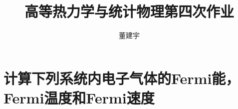 \documentclass[reqno,a4paper,12pt]{amsart}
\title{高等热力学与统计物理第四次作业}
\author{董建宇}
\begin{document}
\maketitle

\titleformat{\section}[hang]{\small}{\thesection}{0.8em}{}{}
\titleformat{\subsection}[hang]{\small}{\thesubsection}{0.8em}{}{}

\section{计算下列系统内电子气体的Fermi能，Fermi温度和Fermi速度}
\end{document}
